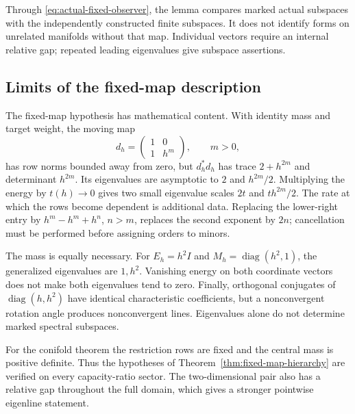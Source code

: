 Through \eqref{eq:actual-fixed-observer},
the lemma compares marked actual subspaces
with the independently constructed finite
subspaces. It does not identify forms
on unrelated manifolds without that map.
Individual vectors require an internal
relative gap; repeated leading eigenvalues
give subspace assertions.

\subsection{Limits of the fixed-map description}

The fixed-map hypothesis has mathematical
content. With identity mass and target
weight, the moving map
\[
 d_h=\begin{pmatrix}1&0\\1&h^m\end{pmatrix},
 \qquad m>0,
\]
has row norms bounded away from zero,
but $d_h^*d_h$ has trace $2+h^{2m}$
and determinant $h^{2m}$. Its eigenvalues
are asymptotic to $2$ and $h^{2m}/2$.
Multiplying the energy by $t(h)\to0$
gives two small eigenvalue scales $2t$ and
$th^{2m}/2$. The rate at which the
rows become dependent is additional
data. Replacing the lower-right entry
by $h^m-h^m+h^n$, $n>m$, replaces the
second exponent by $2n$; cancellation
must be performed before assigning
orders to minors.

The mass is equally necessary. For
$E_h=h^2I$ and $M_h=\operatorname{diag}(h^2,1)$,
the generalized eigenvalues are $1,h^2$.
Vanishing energy on both coordinate
vectors does not make both eigenvalues tend to zero.
Finally, orthogonal conjugates of
$\operatorname{diag}(h,h^2)$ have identical
characteristic coefficients, but a
nonconvergent rotation angle produces
nonconvergent lines. Eigenvalues alone
do not determine marked spectral
subspaces.

For the conifold theorem the restriction
rows are fixed and the central mass is
positive definite. Thus the hypotheses
of Theorem~\ref{thm:fixed-map-hierarchy}
are verified on every capacity-ratio
sector. The two-dimensional pair also
has a relative gap throughout the full
domain, which gives a stronger pointwise
eigenline statement.

